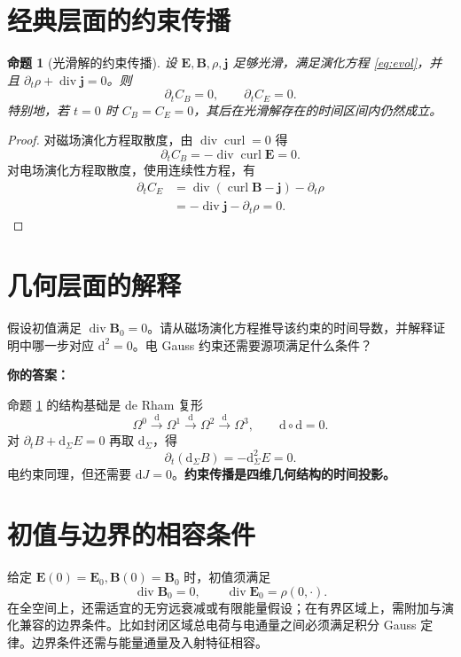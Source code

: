 \documentclass[UTF8,11pt,openany]{ctexbook}
\numberwithin{equation}{chapter}
\newtheorem{proposition}[theorem]{命题}
\theoremstyle{definition}
\theoremstyle{remark}
\newcommand{\dd}{\mathrm d}
\newcommand{\Div}{\operatorname{div}}
\newcommand{\curl}{\operatorname{curl}}
\begin{document}
\section{经典层面的约束传播}
\begin{proposition}[光滑解的约束传播]\label{prop:propagate}
设 $\bm E,\bm B,\rho,\bm j$ 足够光滑，满足演化方程 \eqref{eq:evol}，并且 $\partial_t\rho+\Div\bm j=0$。则
\begin{equation}
\partial_tC_B=0,\qquad \partial_tC_E=0.
\end{equation}
特别地，若 $t=0$ 时 $C_B=C_E=0$，其后在光滑解存在的时间区间内仍然成立。
\end{proposition}
\begin{proof}
对磁场演化方程取散度，由 $\Div\curl=0$ 得
\begin{equation}
\partial_t C_B=-\Div\curl\bm E=0.
\end{equation}
对电场演化方程取散度，使用连续性方程，有
\begin{align}
\partial_tC_E
&=\Div(\curl\bm B-\bm j)-\partial_t\rho\\
&=-\Div\bm j-\partial_t\rho=0.
\end{align}
\end{proof}

\section{几何层面的解释}
\begin{studentinput}
假设初值满足 $\Div\bm B_0=0$。请从磁场演化方程推导该约束的时间导数，并解释证明中哪一步对应 $\dd^2=0$。电 Gauss 约束还需要源项满足什么条件？

\textbf{你的答案：}\vspace{2cm}
\end{studentinput}
命题 \ref{prop:propagate} 的结构基础是 de Rham 复形
\begin{equation}\label{eq:derham}
\Omega^0\xrightarrow{\dd}\Omega^1\xrightarrow{\dd}\Omega^2\xrightarrow{\dd}\Omega^3,
\qquad \dd\circ\dd=0.
\end{equation}
对 $\partial_tB+\dd_\Sigma E=0$ 再取 $\dd_\Sigma$，得
\begin{equation}
\partial_t(\dd_\Sigma B)=-\dd_\Sigma^2E=0.
\end{equation}
电约束同理，但还需要 $\dd J=0$。\textbf{约束传播是四维几何结构的时间投影。}

\section{初值与边界的相容条件}
给定 $\bm E(0)=\bm E_0,\bm B(0)=\bm B_0$ 时，初值须满足
\begin{equation}\label{eq:initConstraints}
\Div\bm B_0=0,
\qquad \Div\bm E_0=\rho(0,\cdot).
\end{equation}
在全空间上，还需适宜的无穷远衰减或有限能量假设；在有界区域上，需附加与演化兼容的边界条件。比如封闭区域总电荷与电通量之间必须满足积分 Gauss 定律。边界条件还需与能量通量及入射特征相容。
\end{document}
